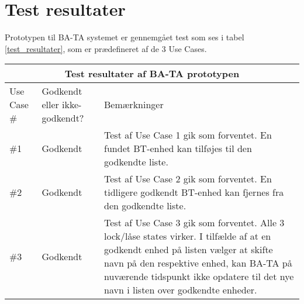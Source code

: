 \graphicspath{{Chapters/TestResultater/}}


\section{Test resultater}

Prototypen til BA-TA systemet er gennemgået test som ses i tabel \ref{test_resultater}, som er prædefineret af de 3 Use Cases.
\setlength{\tabcolsep}{18pt}

{
\centering
\label{test_resultater}
\begin{tabular}{ |p{4.2cm}|p{4.2cm}|p{4.2cm}|  }
		\hline
		\multicolumn{3}{|c|}{\textbf{Test resultater af BA-TA prototypen}} \\
		\hline
		Use Case \#& Godkendt eller ikke-godkendt? &Bemærkninger \\
		\hline
		\#1 & Godkendt & Test af Use Case 1 gik som forventet. En fundet BT-enhed kan tilføjes til den godkendte liste. \\
		\hline
		\#2 & Godkendt & Test af Use Case 2 gik som forventet. En tidligere godkendt BT-enhed kan fjernes fra den godkendte liste. \\
		\hline
		\#3 & Godkendt & Test af Use Case 3 gik som forventet. Alle 3 lock/låse states virker. I tilfælde af at en godkendt enhed på listen vælger at skifte navn på den respektive enhed, kan BA-TA på nuværende tidspunkt ikke opdatere til det nye navn i listen over godkendte enheder. \\
		\hline
\end{tabular}
}
